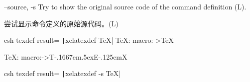 
\begin{docKey}
{--source, -s}{}%
{}%
Try to show the original source code of the command definition (L).

尝试显示命令定义的原始源代码。(L)


\begin{tcblisting}{%
csh texdef result={
\texttt|xelatexdef TeX|
}
}
\TeX:
macro:->\protect \TeX  

\TeX :
\long macro:->T\kern -.1667em\lower .5ex\hbox {E}\kern -.125emX\@
\end{tcblisting}

\begin{tcblisting}{%
csh texdef result={
\texttt|xelatexdef -s TeX|
}
}
\DeclareRobustCommand\TeX{T\kern-.1667em\lower.5ex\hbox{E}\kern-.125emX\@}
\end{tcblisting}

\end{docKey}